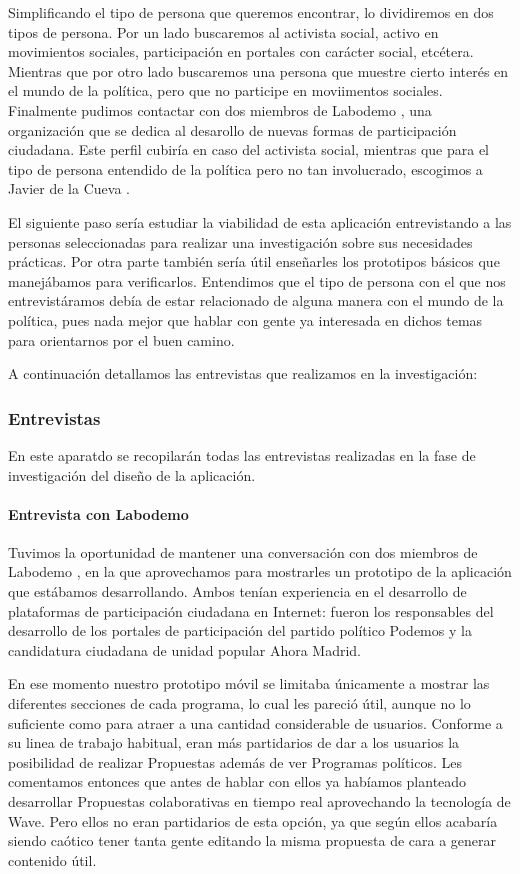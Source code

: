 Simplificando el tipo de persona que queremos encontrar, lo dividiremos en dos tipos de persona. Por un lado buscaremos al activista social, activo en movimientos sociales, participación en portales con carácter social, etcétera. Mientras que por otro lado buscaremos una persona que muestre cierto interés en el mundo de la política, pero que no participe en moviimentos sociales. Finalmente pudimos contactar con dos miembros de Labodemo \cite{ref:labodemo}, una organización que se dedica al desarollo de nuevas formas de participación ciudadana. Este perfil cubiría en caso del activista social, mientras que para el tipo de persona entendido de la política pero no tan involucrado, escogimos a Javier de la Cueva \cite{ref:jdelacueva}.

El siguiente paso sería estudiar la viabilidad de esta aplicación entrevistando a las personas seleccionadas para realizar una investigación sobre sus necesidades prácticas. Por otra parte también sería útil enseñarles los prototipos básicos que manejábamos para verificarlos. Entendimos que el tipo de persona con el que nos entrevistáramos debía de estar relacionado de alguna manera con el mundo de la política, pues nada mejor que hablar con gente ya interesada en dichos temas para orientarnos por el buen camino.

A continuación detallamos las entrevistas que realizamos en la investigación:

\subsubsection{Entrevistas}

En este aparatdo se recopilarán todas las entrevistas realizadas en la fase de investigación del diseño de la aplicación.

\paragraph{Entrevista con Labodemo}

Tuvimos la oportunidad de mantener una conversación con dos miembros de Labodemo \cite{ref:labodemo}, en la que aprovechamos para mostrarles un prototipo de la aplicación que estábamos desarrollando. Ambos tenían experiencia en el desarrollo de plataformas de participación ciudadana en Internet: fueron los responsables del desarrollo de los portales de participación del partido político Podemos y la candidatura ciudadana de unidad popular Ahora Madrid.

En ese momento nuestro prototipo móvil se limitaba únicamente a mostrar las diferentes secciones de cada programa, lo cual les pareció útil, aunque no lo suficiente como para atraer a una cantidad considerable de usuarios. Conforme a su linea de trabajo habitual, eran más partidarios de dar a los usuarios la posibilidad de realizar Propuestas además de ver Programas políticos. Les comentamos entonces que antes de hablar con ellos ya habíamos planteado desarrollar Propuestas colaborativas en tiempo real aprovechando la tecnología de Wave. Pero ellos no eran partidarios de esta opción, ya que según ellos acabaría siendo caótico tener tanta gente editando la misma propuesta de cara a generar contenido útil. 


